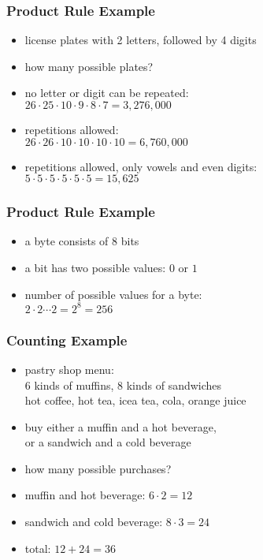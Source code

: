 \documentclass[dvipsnames]{beamer}
\begin{document}
\begin{frame}
  \frametitle{Product Rule Example}

  \begin{itemize}
    \item license plates with 2 letters, followed by 4 digits
    \item how many possible plates?

    \pause
    \medskip
    \item no letter or digit can be repeated:\\
      $26 \cdot 25 \cdot 10 \cdot 9 \cdot 8 \cdot 7 = 3,276,000$

    \pause
    \medskip
    \item repetitions allowed:\\
      $26 \cdot 26 \cdot 10 \cdot 10 \cdot 10 \cdot 10 = 6,760,000$

    \pause
    \medskip
    \item repetitions allowed, only vowels and even digits:\\
      $5 \cdot 5 \cdot 5 \cdot 5 \cdot 5 \cdot 5 = 15,625$
  \end{itemize}
\end{frame}

\begin{frame}
  \frametitle{Product Rule Example}

  \begin{itemize}
    \item a byte consists of 8 bits
    \item a bit has two possible values: $0$ or $1$

    \medskip
    \item number of possible values for a byte:\\
      $2 \cdot 2 \cdots 2 = 2^8 = 256$
  \end{itemize}
\end{frame}

\begin{frame}
  \frametitle{Counting Example}

  \begin{itemize}
    \item pastry shop menu:\\
      6 kinds of muffins, 8 kinds of sandwiches\\
      hot coffee, hot tea, icea tea, cola, orange juice

    \medskip
    \item buy either a muffin and a hot beverage,\\
      or a sandwich and a cold beverage
    \item how many possible purchases?

    \pause
    \medskip
    \item muffin and hot beverage: $6 \cdot 2 = 12$
    \item sandwich and cold beverage: $8 \cdot 3 = 24$
    \item total: $12 + 24 = 36$
  \end{itemize}
\end{frame}
\end{document}
